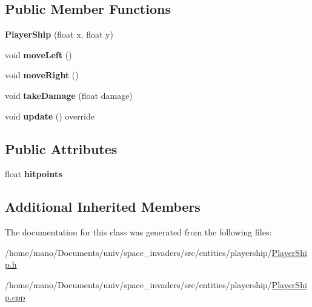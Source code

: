 \subsection*{Public Member Functions}
\begin{DoxyCompactItemize}
\item 
\mbox{\label{classentities_1_1playership_1_1PlayerShip_a17a64b5b78b9fa9c06601634d527ef77}} 
{\bfseries Player\+Ship} (float x, float y)
\item 
\mbox{\label{classentities_1_1playership_1_1PlayerShip_ae1855813ac0cfde9be1d9dfbf307f72e}} 
void {\bfseries move\+Left} ()
\item 
\mbox{\label{classentities_1_1playership_1_1PlayerShip_a9708f989ced14f082c36051e8a9710f7}} 
void {\bfseries move\+Right} ()
\item 
\mbox{\label{classentities_1_1playership_1_1PlayerShip_a0fdd05020563087b024831c93dad8ee1}} 
void {\bfseries take\+Damage} (float damage)
\item 
\mbox{\label{classentities_1_1playership_1_1PlayerShip_a618c1a8fd743a8fcbe9e60b44bd21dca}} 
void {\bfseries update} () override
\end{DoxyCompactItemize}
\subsection*{Public Attributes}
\begin{DoxyCompactItemize}
\item 
\mbox{\label{classentities_1_1playership_1_1PlayerShip_ab9cf9712f43739b1ba9d6b83ae45fd4c}} 
float {\bfseries hitpoints}
\end{DoxyCompactItemize}
\subsection*{Additional Inherited Members}


The documentation for this class was generated from the following files\+:\begin{DoxyCompactItemize}
\item 
/home/mano/\+Documents/univ/space\+\_\+invaders/src/entities/playership/\hyperlink{PlayerShip_8h}{Player\+Ship.\+h}\item 
/home/mano/\+Documents/univ/space\+\_\+invaders/src/entities/playership/\hyperlink{PlayerShip_8cpp}{Player\+Ship.\+cpp}\end{DoxyCompactItemize}
